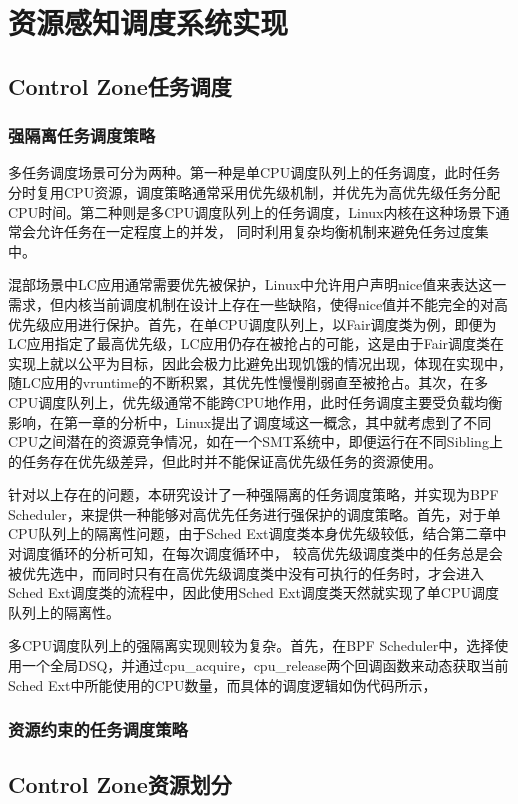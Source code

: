\chapter{资源感知调度系统实现}\label{chap:sched_policy}

\section{Control Zone任务调度}


\subsection{强隔离任务调度策略}

多任务调度场景可分为两种。第一种是单CPU调度队列上的任务调度，此时任务分时复用CPU资源，调度策略通常采用优先级机制，并优先为高优先级任务分配CPU时间。第二种则是多CPU调度队列上的任务调度，Linux内核在这种场景下通常会允许任务在一定程度上的并发， 同时利用复杂均衡机制来避免任务过度集中。

混部场景中LC应用通常需要优先被保护，Linux中允许用户声明nice值来表达这一需求，但内核当前调度机制在设计上存在一些缺陷，使得nice值并不能完全的对高优先级应用进行保护。首先，在单CPU调度队列上，以Fair调度类为例，即便为LC应用指定了最高优先级，LC应用仍存在被抢占的可能，这是由于Fair调度类在实现上就以公平为目标，因此会极力比避免出现饥饿的情况出现，体现在实现中，随LC应用的vruntime的不断积累，其优先性慢慢削弱直至被抢占。其次，在多CPU调度队列上，优先级通常不能跨CPU地作用，此时任务调度主要受负载均衡影响，在第一章的分析中，Linux提出了调度域这一概念，其中就考虑到了不同CPU之间潜在的资源竞争情况，如在一个SMT系统中，即便运行在不同Sibling上的任务存在优先级差异，但此时并不能保证高优先级任务的资源使用。

针对以上存在的问题，本研究设计了一种强隔离的任务调度策略，并实现为BPF Scheduler，来提供一种能够对高优先任务进行强保护的调度策略。首先，对于单CPU队列上的隔离性问题，由于Sched Ext调度类本身优先级较低，结合第二章中对调度循环的分析可知，在每次调度循环中， 较高优先级调度类中的任务总是会被优先选中，而同时只有在高优先级调度类中没有可执行的任务时，才会进入Sched Ext调度类的流程中，因此使用Sched Ext调度类天然就实现了单CPU调度队列上的隔离性。

多CPU调度队列上的强隔离实现则较为复杂。首先，在BPF Scheduler中，选择使用一个全局DSQ，并通过cpu\_acquire，cpu\_release两个回调函数来动态获取当前Sched Ext中所能使用的CPU数量，而具体的调度逻辑如伪代码所示，

\subsection{资源约束的任务调度策略}


\section{Control Zone资源划分}